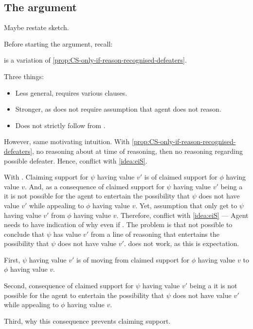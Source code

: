 \subsection{The argument}

\begin{note}
  \color{red}
  Maybe restate sketch.
\end{note}

\begin{note}
  Before starting the argument, recall:
  \begin{quote}
    \vspace{-\baselineskip}
    \propRecogniseDefeaters*
  \end{quote}
  \nI{} is a variation of \autoref{prop:CS-only-if-reason-recognised-defeaters}.

  Three things:
  \begin{itemize}
  \item Less general, requires various clauses.
  \item Stronger, as does not require assumption that agent does not reason.
  \item Does not strictly follow from \requ{}.
  \end{itemize}

  However, same motivating intuition.
  With \autoref{prop:CS-only-if-reason-recognised-defeaters}, no reasoning about \requ{} at time of reasoning, then no reasoning regarding possible defeater.
  Hence, conflict with \autoref{idea:eiS}.

  With \nI{}.
  Claiming support for \(\psi\) having value \(v'\) is \requ{} of claimed support for \(\phi\) having value \(v\).
  And, as a consequence of claimed support for \(\psi\) having value \(v'\) being a \requ{} it is not possible for the agent to entertain the possibility that \(\psi\) does not have value \(v'\) while appealing to \(\phi\) having value \(v\).
  Yet, assumption that only get to \(\psi\) having value \(v'\) from \(\phi\) having value \(v\).
  Therefore, conflict with \autoref{idea:eiS} --- Agent needs to have indication of why even if \mom{}.
  The problem is that not possible to conclude that \(\psi\) has value \(v'\) from a line of reasoning that entertains the possibility that \(\psi\) does not have value \(v'\).
  \requ{} does not work, as this is expectation.
\end{note}

\begin{note}
  First, \(\psi\) having value \(v'\) is \requ{} of moving from claimed support for \(\phi\) having value \(v\) to \(\phi\) having value \(v\).

  Second, consequence of claimed support for \(\psi\) having value \(v'\) being a \requ{} it is not possible for the agent to entertain the possibility that \(\psi\) does not have value \(v'\) while appealing to \(\phi\) having value \(v\).

  Third, why this consequence prevents claiming support.
\end{note}

